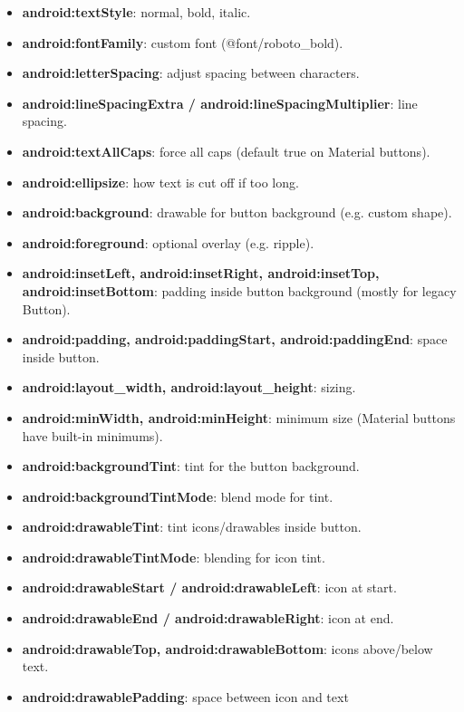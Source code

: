 \documentclass{report}
\begin{document}
\begin{itemize}
\begin{itemize}
                \item \textbf{android:textStyle}: normal, bold, italic.
                \item \textbf{android:fontFamily}: custom font (@font/roboto\_bold).
                \item \textbf{android:letterSpacing}: adjust spacing between characters.
                \item \textbf{android:lineSpacingExtra / android:lineSpacingMultiplier}: line spacing.
                \item \textbf{android:textAllCaps}: force all caps (default true on Material buttons).
                \item \textbf{android:ellipsize}: how text is cut off if too long.
                \item \textbf{android:background}: drawable for button background (e.g. custom shape).
                \item \textbf{android:foreground}: optional overlay (e.g. ripple).
                \item \textbf{android:insetLeft, android:insetRight, android:insetTop, android:insetBottom}: padding inside button background (mostly for legacy Button).
                \item \textbf{android:padding, android:paddingStart, android:paddingEnd}: space inside button.
                \item \textbf{android:layout\_width, android:layout\_height}: sizing.
                \item \textbf{android:minWidth, android:minHeight}: minimum size (Material buttons have built-in minimums).
                \item \textbf{android:backgroundTint}: tint for the button background.
                \item \textbf{android:backgroundTintMode}: blend mode for tint.
                \item \textbf{android:drawableTint}: tint icons/drawables inside button.
                \item \textbf{android:drawableTintMode}: blending for icon tint.
                \item \textbf{android:drawableStart / android:drawableLeft}: icon at start.
                \item \textbf{android:drawableEnd / android:drawableRight}: icon at end.
                \item \textbf{android:drawableTop, android:drawableBottom}: icons above/below text.
                \item \textbf{android:drawablePadding}: space between icon and text

\end{itemize}
\end{itemize}
\end{document}
